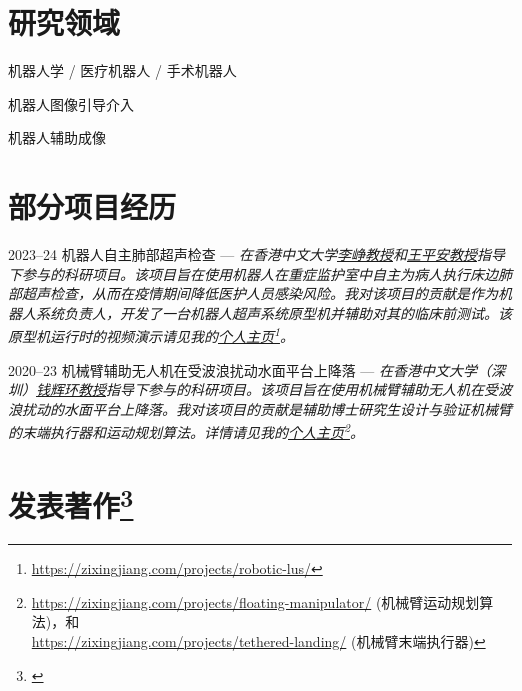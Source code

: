 \documentclass[utf8, 11pt,letterpaper]{report}
\newcommand{\listitemspace}{0.25em}
\renewenvironment{itemize}
{\begin{list}{}{\setlength{\leftmargin}{0em}
			\setlength{\parskip}{0em}
			\setlength{\itemsep}{\listitemspace}
			\setlength{\parsep}{\listitemspace}}}
	{\end{list}}
\begin{document}
\section*{研究领域}
\begin{itemize}
	\item 机器人学 / 医疗机器人 / 手术机器人
	\item 机器人图像引导介入
	\item 机器人辅助成像
\end{itemize}
	
\section*{部分项目经历}
\begin{tablist}
	\item[2023--24] \tab 机器人自主肺部超声检查 --- \emph{在香港中文大学\href{https://www.surgery.cuhk.edu.hk/profile.asp?alias=zli}{李峥教授}和\href{https://www.cse.cuhk.edu.hk/people/faculty/pheng-ann-heng/}{王平安教授}指导下参与的科研项目。该项目旨在使用机器人在重症监护室中自主为病人执行床边肺部超声检查，从而在疫情期间降低医护人员感染风险。我对该项目的贡献是作为机器人系统负责人，开发了一台机器人超声系统原型机并辅助对其的临床前测试。该原型机运行时的视频演示请见我的\href{https://www.zixingjiang.com/projects/robotic-lus/}{个人主页}\footnote{ \href{https://zixingjiang.com/projects/robotic-lus/}{https://zixingjiang.com/projects/robotic-lus/}}。}
	
	\item[2020--23] \tab 机械臂辅助无人机在受波浪扰动水面平台上降落 --- \textit{在香港中文大学（深圳）\href{https://sse.cuhk.edu.cn/en/faculty/qianhuihuan}{钱辉环教授}指导下参与的科研项目。该项目旨在使用机械臂辅助无人机在受波浪扰动的水面平台上降落。我对该项目的贡献是辅助博士研究生设计与验证机械臂的末端执行器和运动规划算法。详情请见我的\href{https://www.zixingjiang.com/projects\#marine-robotics}{个人主页}\footnote{ \href{https://zixingjiang.com/projects/floating-manipulator/}{https://zixingjiang.com/projects/floating-manipulator/} (机械臂运动规划算法)，和 \\ \href{https://zixingjiang.com/projects/tethered-landing/}{https://zixingjiang.com/projects/tethered-landing/}  (机械臂末端执行器)}。}
\end{tablist}
	
\section*{发表著作\protect\footnote{\label{authorship}}}
\end{document}
